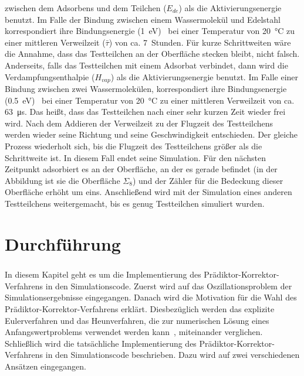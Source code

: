 \documentclass{listhesis}
\begin{document}
zwischen dem Adsorbens und dem Teilchen ($E_{de}$) als die Aktivierungsenergie benutzt. Im Falle der Bindung zwischen einem Wassermolekül und Edelstahl korrespondiert ihre Bindungsenergie (\SI{1}{\electronvolt})~\cite{grinham} bei einer Temperatur von \SI{20}{\celsius} zu einer mittleren Verweilzeit ($\bar{\tau}$) von ca. \SI{7}{Stunden}. Für kurze Schrittweiten wäre die Annahme, dass das Testteilchen an der Oberfläche stecken bleibt, nicht falsch. Anderseits, falls das Testteilchen mit einem Adsorbat verbindet, dann wird die Verdampfungsenthalpie ($H_{vap}$) als die Aktivierungsenergie benutzt. Im Falle einer Bindung zwischen zwei Wassermolekülen, korrespondiert ihre Bindungsenergie (\SI{0.5}{\electronvolt})~\cite{grinham} bei einer Temperatur von \SI{20}{\celsius} zu einer mittleren Verweilzeit von ca. \SI{63}{\micro\s}. Das heißt, dass das Testteilchen nach einer sehr kurzen Zeit wieder frei wird. Nach dem Addieren der Verweilzeit zu der Flugzeit des Testteilchens werden wieder seine Richtung und seine Geschwindigkeit entschieden. Der gleiche Prozess wiederholt sich, bis die Flugzeit des Testteilchens größer als die Schrittweite ist. In diesem Fall endet seine Simulation. Für den nächsten Zeitpunkt adsorbiert es an der Oberfläche, an der es gerade befindet (in der Abbildung ist sie die Oberfläche $\Sigma_8$) und der Zähler für die Bedeckung dieser Oberfläche erhöht um eins. Anschließend wird mit der Simulation eines anderen Testteilchens weitergemacht, bis es genug Testteilchen simuliert wurden.

\chapter{Durchführung} \label{chap:durchfuehrung}
\paragraph{}
In diesem Kapitel geht es um die Implementierung des Prädiktor-Korrektor-Verfa\-hrens in den Simulationscode. Zuerst wird auf das Oszillationsproblem der Simulationsergebnisse eingegangen. Danach wird die Motivation für die Wahl des Prädiktor-Korrektor-Verfahrens erklärt. Diesbezüglich werden das explizite Eulerverfahren und das Heunverfahren, die zur numerischen Lösung eines Anfangswertproblems verwendet werden kann~\cite{ulbrich}, miteinander verglichen. Schließlich wird die tatsächliche Implementierung des Prädiktor-Korrektor-Verfahrens in den Simulationscode beschrieben. Dazu wird auf zwei verschiedenen Ansätzen eingegangen.
\end{document}
